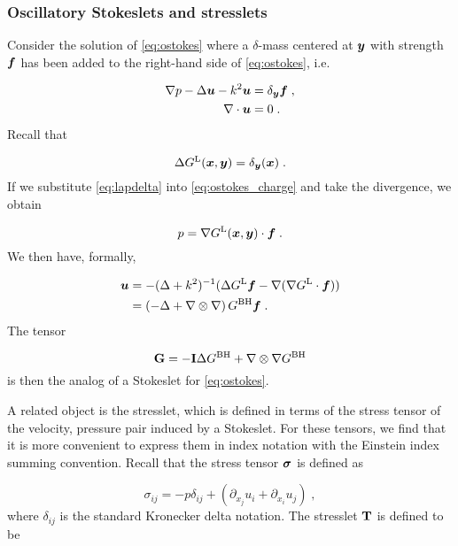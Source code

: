 \subsubsection{Oscillatory Stokeslets and stresslets}
Consider the solution of
\cref{eq:ostokes} where a $\delta$-mass
centered at ${\boldsymbol y}$ with strength ${\boldsymbol f}$
has been added to the right-hand side of \cref{eq:ostokes}, i.e.

\begin{align}
  \nabla p - \Delta {\boldsymbol u} - k^2 {\boldsymbol u} &= \delta_{\boldsymbol y} {\boldsymbol f} \; ,
  \label{eq:ostokes_charge}  \\
  \nabla \cdot {\boldsymbol u} &= 0 \; . \nonumber
\end{align}
Recall that

\begin{equation}
 \Delta G^{\textrm{L}}({\boldsymbol x},{\boldsymbol y}) = \delta_{\boldsymbol y}({\boldsymbol x}) \; . \label{eq:lapdelta}
\end{equation}
If we substitute \eqref{eq:lapdelta} into
\eqref{eq:ostokes_charge} and take the divergence,
we obtain

\begin{equation}
  p = \nabla G^{\textrm{L}}({\boldsymbol x},{\boldsymbol y}) \cdot {\boldsymbol f} \; . \nonumber
\end{equation}
We then have, formally,

\begin{align}
  {\boldsymbol u} &= - (\Delta + k^2)^{-1} ( \Delta G^{\textrm{L}} {\boldsymbol f}
  - \nabla (\nabla G^{\textrm{L}} \cdot {\boldsymbol f} ) ) \nonumber \\
  &= \left ( -\Delta + \nabla \otimes \nabla \right )
  G^{\textrm{BH}} {\boldsymbol f} \; . \nonumber
\end{align}
The tensor

\begin{equation} \label{eq:ostokeslet}
  {\bf G} = - {\bf I} \Delta G^{\textrm{BH}} + \nabla \otimes \nabla G^{\textrm{BH}}
\end{equation}
is then the analog of a Stokeslet
\cite{Pozrikidis1992} for \eqref{eq:ostokes}.

A related object is the stresslet, which is defined
in terms of the stress tensor of the velocity, pressure
pair induced by a Stokeslet. For these tensors, we find
that it is more convenient to express them in index notation
with the Einstein index summing convention.
Recall that the stress tensor ${\boldsymbol \sigma}$ is defined as 

\begin{equation}
  \sigma_{ij} = -p \delta_{ij} + \left ( \partial_{x_j}u_i
  +\partial_{x_i} u_j \right ) \; , \nonumber
\end{equation}
where $\delta_{ij}$ is the standard Kronecker delta notation.
The stresslet ${\bf T}$ is defined to be

